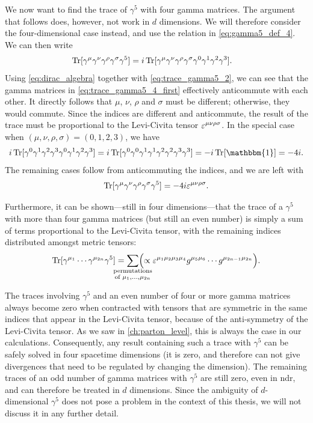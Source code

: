 We now want to find the trace of $\gamma^5$ with four gamma matrices. The argument that follows does, however, not work in $d$ dimensions.
We will therefore consider the four-dimensional case instead, and use the relation in \cref{eq:gamma5_def_4}. We can then write
\begin{align}\label{eq:trace_gamma5_4_first}
    \operatorname{Tr}[\gamma^\mu\gamma^\nu\gamma^\rho\gamma^\sigma\gamma^5] &= i \operatorname{Tr}[\gamma^\mu\gamma^\nu\gamma^\rho\gamma^\sigma\gamma^0\gamma^1\gamma^2\gamma^3].
\end{align}
Using \cref{eq:dirac_algebra} together with \cref{eq:trace_gamma5_2}, we can see that the gamma matrices in \cref{eq:trace_gamma5_4_first} effectively anticommute with each other. It directly follows that $\mu$, $\nu$, $\rho$ and $\sigma$ must be different; otherwise, they would commute. Since the indices are different and anticommute, the result of the trace must be proportional to the Levi-Civita tensor $\varepsilon^{\mu\nu\rho\sigma}$. In the special case when $(\mu,\nu,\rho,\sigma)=(0,1,2,3)$, we have
\begin{equation}
    i \Tr[\gamma^0\gamma^1\gamma^2\gamma^3\gamma^0\gamma^1\gamma^2\gamma^3]
    = i \Tr[\gamma^0\gamma^0\gamma^1\gamma^1\gamma^2\gamma^2\gamma^3\gamma^3]
    = -i \Tr[\mathbbm{1}]
    = -4i.
\end{equation}
The remaining cases follow from anticommuting the indices, and we are left with
\begin{equation}
    \operatorname{Tr}[\gamma^\mu\gamma^\nu\gamma^\rho\gamma^\sigma\gamma^5] = -4i\varepsilon^{\mu\nu\rho\sigma}.
\end{equation}

Furthermore, it can be shown---still in four dimensions---that the trace of a $\gamma^5$ with more than four gamma matrices (but still an even number) is simply a sum of terms proportional to the Levi-Civita tensor, with the remaining indices distributed amongst metric tensors:
\begin{equation}
    \Tr[\gamma^{\mu_1}\cdots\gamma^{\mu_{2n}}\gamma^5] = 
    \sum_{\mathclap{ \substack{\text{permutations} \\ \text{of }\mu_1,\ldots,\mu_{2n}}}} 
    \Bigl(\propto\eps^{\mu_1\mu_2\mu_3\mu_4} g^{\mu_5\mu_6}\cdots g^{\mu_{2n-1}\mu_{2n}}\Bigr).
\end{equation}

The traces involving $\gamma^5$ and an even number of four or more gamma matrices always become zero when contracted with tensors that are symmetric in the same indices that appear in the Levi-Civita tensor, because of the anti-symmetry of the Levi-Civita tensor.
As we saw in \cref{ch:parton_level}, this is always the case in our calculations.
Consequently, any result containing such a trace with $\gamma^5$ can be safely solved in four spacetime dimensions (it is zero, and therefore can not give divergences that need to be regulated by changing the dimension).
The remaining traces of an odd number of gamma matrices with $\gamma^5$ are still zero, even in \gls{ndr}, and can therefore be treated in $d$ dimensions.
Since the ambiguity of $d$-dimensional $\gamma^5$ does not pose a problem in the context of this thesis, we will not discuss it in any further detail.




